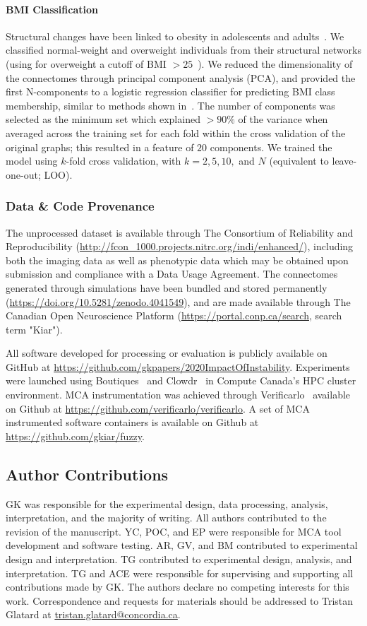 \documentclass[fleqn,10pt]{SelfArx} %
\begin{document}
\paragraph{BMI Classification} Structural changes have been linked to obesity in adolescents and
adults~\cite{Raji2010-lh}. We classified normal-weight and overweight individuals from their structural networks (using
for overweight a cutoff of BMI $> 25$~\cite{Gupta2015-ap}). We reduced the dimensionality of the connectomes through
principal component analysis (PCA), and provided the first N-components to a logistic regression classifier for
predicting BMI class membership, similar to methods shown in~\cite{Gupta2015-ap,Park2015-uj}. The number of components
was selected as the minimum set which explained $> 90\%$ of the variance when averaged across the training set for each
fold within the cross validation of the original graphs; this resulted in a feature of $20$ components. We trained the
model using $k$-fold cross validation, with $k = 2, 5, 10,$ and $N$ (equivalent to leave-one-out; LOO).

\subsubsection*{Data \& Code Provenance}
The unprocessed dataset is available through The Consortium of Reliability and Reproducibility
(\url{http://fcon_1000.projects.nitrc.org/indi/enhanced/}), including both the imaging data as well as phenotypic data
which may be obtained upon submission and compliance with a Data Usage Agreement. The connectomes generated through
simulations have been bundled and stored permanently (\url{https://doi.org/10.5281/zenodo.4041549}), and are made
available through The Canadian Open Neuroscience Platform (\url{https://portal.conp.ca/search}, search term "Kiar").

All software developed for processing or evaluation is publicly available on GitHub at
\url{https://github.com/gkpapers/2020ImpactOfInstability}. Experiments were launched using
Boutiques~\cite{Glatard2018-tu} and Clowdr~\cite{Kiar2019-sr} in Compute Canada's HPC cluster environment. MCA
instrumentation was achieved through Verificarlo~\cite{Denis2016-wo} available on Github at
\url{https://github.com/verificarlo/verificarlo}. A set of MCA instrumented software containers is available on Github
at \url{https://github.com/gkiar/fuzzy}.


\subsection*{Author Contributions}
GK was responsible for the experimental design, data processing, analysis, interpretation, and the majority of writing.
All authors contributed to the revision of the manuscript. YC, POC, and EP were responsible for MCA tool development
and software testing. AR, GV, and BM contributed to experimental design and interpretation. TG contributed to
experimental design, analysis, and interpretation. TG and ACE were responsible for supervising and supporting all
contributions made by GK. The authors declare no competing interests for this work. Correspondence and requests for
materials should be addressed to Tristan Glatard at \url{tristan.glatard@concordia.ca}.
\end{document}
